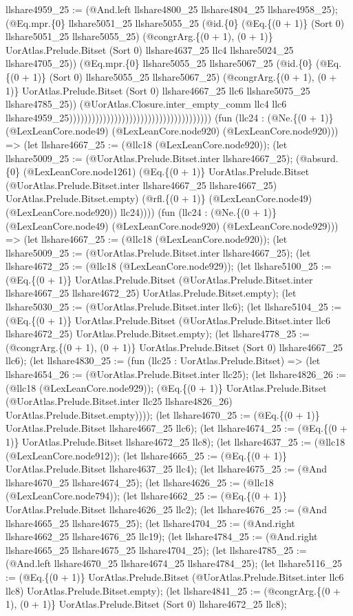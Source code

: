 \documentclass[11pt]{article}
\begin{document}
llshare4959\_25 := (@And.left llshare4800\_25 llshare4804\_25 llshare4958\_25); (@Eq.mpr.\{0\} llshare5051\_25 llshare5055\_25 (@id.\{0\} (@Eq.\{(0 + 1)\} (Sort 0) llshare5051\_25 llshare5055\_25) (@congrArg.\{(0 + 1), (0 + 1)\} UorAtlas.Prelude.Bitset (Sort 0) llshare4637\_25 llc4 llshare5024\_25 llshare4705\_25)) (@Eq.mpr.\{0\} llshare5055\_25 llshare5067\_25 (@id.\{0\} (@Eq.\{(0 + 1)\} (Sort 0) llshare5055\_25 llshare5067\_25) (@congrArg.\{(0 + 1), (0 + 1)\} UorAtlas.Prelude.Bitset (Sort 0) llshare4667\_25 llc6 llshare5075\_25 llshare4785\_25)) (@UorAtlas.Closure.inter\_empty\_comm llc4 llc6 llshare4959\_25)))))))))))))))))))))))))))))))))))))) (fun (llc24 : (@Ne.\{(0 + 1)\} (@LexLeanCore.node49) (@LexLeanCore.node920) (@LexLeanCore.node920))) => (let llshare4667\_25 := (@llc18 (@LexLeanCore.node920)); (let llshare5009\_25 := (@UorAtlas.Prelude.Bitset.inter llshare4667\_25); (@absurd.\{0\} (@LexLeanCore.node1261) (@Eq.\{(0 + 1)\} UorAtlas.Prelude.Bitset (@UorAtlas.Prelude.Bitset.inter llshare4667\_25 llshare4667\_25) UorAtlas.Prelude.Bitset.empty) (@rfl.\{(0 + 1)\} (@LexLeanCore.node49) (@LexLeanCore.node920)) llc24)))) (fun (llc24 : (@Ne.\{(0 + 1)\} (@LexLeanCore.node49) (@LexLeanCore.node920) (@LexLeanCore.node929))) => (let llshare4667\_25 := (@llc18 (@LexLeanCore.node920)); (let llshare5009\_25 := (@UorAtlas.Prelude.Bitset.inter llshare4667\_25); (let llshare4672\_25 := (@llc18 (@LexLeanCore.node929)); (let llshare5100\_25 := (@Eq.\{(0 + 1)\} UorAtlas.Prelude.Bitset (@UorAtlas.Prelude.Bitset.inter llshare4667\_25 llshare4672\_25) UorAtlas.Prelude.Bitset.empty); (let llshare5030\_25 := (@UorAtlas.Prelude.Bitset.inter llc6); (let llshare5104\_25 := (@Eq.\{(0 + 1)\} UorAtlas.Prelude.Bitset (@UorAtlas.Prelude.Bitset.inter llc6 llshare4672\_25) UorAtlas.Prelude.Bitset.empty); (let llshare4778\_25 := (@congrArg.\{(0 + 1), (0 + 1)\} UorAtlas.Prelude.Bitset (Sort 0) llshare4667\_25 llc6); (let llshare4830\_25 := (fun (llc25 : UorAtlas.Prelude.Bitset) => (let llshare4654\_26 := (@UorAtlas.Prelude.Bitset.inter llc25); (let llshare4826\_26 := (@llc18 (@LexLeanCore.node929)); (@Eq.\{(0 + 1)\} UorAtlas.Prelude.Bitset (@UorAtlas.Prelude.Bitset.inter llc25 llshare4826\_26) UorAtlas.Prelude.Bitset.empty)))); (let llshare4670\_25 := (@Eq.\{(0 + 1)\} UorAtlas.Prelude.Bitset llshare4667\_25 llc6); (let llshare4674\_25 := (@Eq.\{(0 + 1)\} UorAtlas.Prelude.Bitset llshare4672\_25 llc8); (let llshare4637\_25 := (@llc18 (@LexLeanCore.node912)); (let llshare4665\_25 := (@Eq.\{(0 + 1)\} UorAtlas.Prelude.Bitset llshare4637\_25 llc4); (let llshare4675\_25 := (@And llshare4670\_25 llshare4674\_25); (let llshare4626\_25 := (@llc18 (@LexLeanCore.node794)); (let llshare4662\_25 := (@Eq.\{(0 + 1)\} UorAtlas.Prelude.Bitset llshare4626\_25 llc2); (let llshare4676\_25 := (@And llshare4665\_25 llshare4675\_25); (let llshare4704\_25 := (@And.right llshare4662\_25 llshare4676\_25 llc19); (let llshare4784\_25 := (@And.right llshare4665\_25 llshare4675\_25 llshare4704\_25); (let llshare4785\_25 := (@And.left llshare4670\_25 llshare4674\_25 llshare4784\_25); (let llshare5116\_25 := (@Eq.\{(0 + 1)\} UorAtlas.Prelude.Bitset (@UorAtlas.Prelude.Bitset.inter llc6 llc8) UorAtlas.Prelude.Bitset.empty); (let llshare4841\_25 := (@congrArg.\{(0 + 1), (0 + 1)\} UorAtlas.Prelude.Bitset (Sort 0) llshare4672\_25 llc8); 
\end{document}
